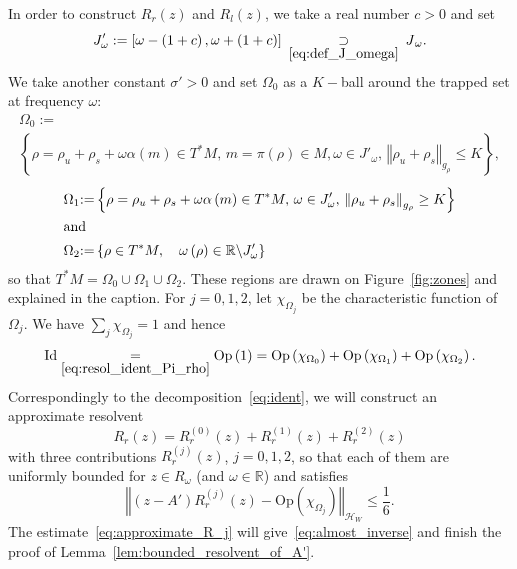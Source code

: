 \documentclass[AHL,Unicode,longabstracts,published]{cedram}
\newcommand{\clH}{\mathcal{H}}
\newcommand{\Opp}{\mathrm{Op}}
\newcommand{\Id}{\mathrm{Id}}
\newcommand{\bbR}{\mathbb{R}}
\newcommand{\clH}{\mathcal{H}}
\newcommand{\bbR}{\mathbb{R}}
\begin{document}
In order to construct $R_{r}(z)$ and $R_{l}(z)$, we take a real number $c>0$ and set
\begin{equation}\label{eq:def_J'}
J'_{\omega}:=\left[\omega-\left(1+c\right),\omega+\left(1+c\right)\right]\:\underset{\eqref{eq:def_J_omega}}{\supset}\:J{}_{\omega}.
\end{equation}
We take another constant $\sigma'>0$ and set $\Omega_{0}$ as a $K-$ball around the trapped set at frequency $\omega$:
\begin{multline}\label{eq:def_Omega_0}
\Omega_{0}:=\\
\left\{ \rho=\rho_{u}+\rho_{s}+\omega\alpha\left(m\right)\in T^{*}M,\,m=\pi\left(\rho\right)\in M,\omega\in J'_{\omega},\,\left\Vert \rho_{u}+\rho_{s}\right\Vert _{g_{\rho}}\leq K\right\},
\end{multline}
\begin{align}
\Omega_{1} &{:=}\left\{ \rho=\rho_{u}+\rho_{s}+\omega\alpha\left(m\right)\in T^{*}M,\,\omega\in J'_{\omega},\,\left\Vert \rho_{u}+\rho_{s}\right\Vert _{g_{\rho}}\geq K\right\}\label{eq:def_Omega_1}
\\
\intertext{and}
\Omega_{2} &{:=}\left\{ \rho\in T^{*}M,\quad\omega\left(\rho\right)\in\bbR\backslash J'_{\omega}\right\}\label{eq:def_Omega_2}
\end{align}
so that $T^{*}M=\Omega_{0}\cup\Omega_{1}\cup\Omega_{2}$. These regions are drawn on Figure~\ref{fig:zones} and explained in the caption. For $j=0,1,2$, let $\chi_{\Omega_{j}}$ be the characteristic function of $\Omega_{j}$. We have $\sum_{j}\chi_{\Omega_{j}}=1$ and hence
\begin{equation}\label{eq:ident}
\Id \underset{\eqref{eq:resol_ident_Pi_rho}}{=}\Opp \left(1\right)=\Opp \left(\chi_{\Omega_{0}}\right)+\Opp \left(\chi_{\Omega_{1}}\right)+\Opp \left(\chi_{\Omega_{2}}\right).
\end{equation}
Correspondingly to the decomposition~\eqref{eq:ident}, we will construct an approximate resolvent
\[
R_{r}\left(z\right)=R_{r}^{\left(0\right)}\left(z\right)+R_{r}^{\left(1\right)}\left(z\right)+R_{r}^{\left(2\right)}\left(z\right)
\]
with three contributions $R_{r}^{(j)}(z)$, $j=0,1,2$, so that each of them are uniformly bounded for $z\in R_{\omega}$ (and $\omega\in\bbR$) and satisfies
\begin{equation}\label{eq:approximate_R_j}
\left\Vert \left(z-A'\right)R_{r}^{\left(j\right)}\left(z\right)-\Opp \left(\chi_{\Omega_{j}}\right)\right\Vert _{\clH _{W}}\leq\frac{1}{6}.
\end{equation}
The estimate~\eqref{eq:approximate_R_j} will give~\eqref{eq:almost_inverse} and finish the proof of Lemma~\ref{lem:bounded_resolvent_of_A'}.
\end{document}
